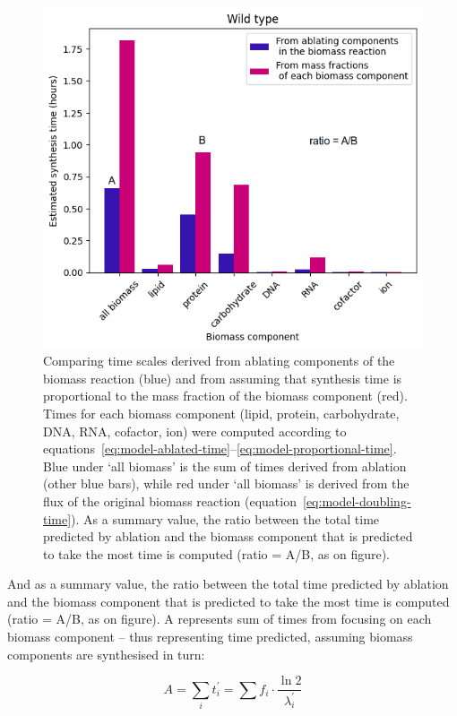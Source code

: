 \begin{figure}
  \centering
  \includegraphics[width=.9\linewidth]{ablation_example_ratio.png}
  \caption{
    Comparing time scales derived from ablating components of the biomass reaction (blue) and from assuming that synthesis time is proportional to the mass fraction of the biomass component (red).
    Times for each biomass component (lipid, protein, carbohydrate, DNA, RNA, cofactor, ion) were computed according to equations~\ref{eq:model-ablated-time}--\ref{eq:model-proportional-time}.
    Blue under `all biomass' is the sum of times derived from ablation (other blue bars), while red under `all biomass' is derived from the flux of the original biomass reaction (equation~\ref{eq:model-doubling-time}).
    As a summary value, the ratio between the total time predicted by ablation and the biomass component that is predicted to take the most time is computed (ratio = A/B, as on figure).
  }
  \label{fig:model-ablate-times}
\end{figure}

And as a summary value, the ratio between the total time predicted by ablation and the biomass component that is predicted to take the most time is computed (ratio = A/B, as on figure).
A represents sum of times from focusing on each biomass component -- thus representing time predicted, assuming biomass components are synthesised in turn:

\begin{equation}
  A = \sum_{i} t_{i}^{\prime} = \sum f_{i} \cdot \frac{\ln 2}{\lambda_{i}^{\prime}}
  \label{eq:model-a}
\end{equation}

